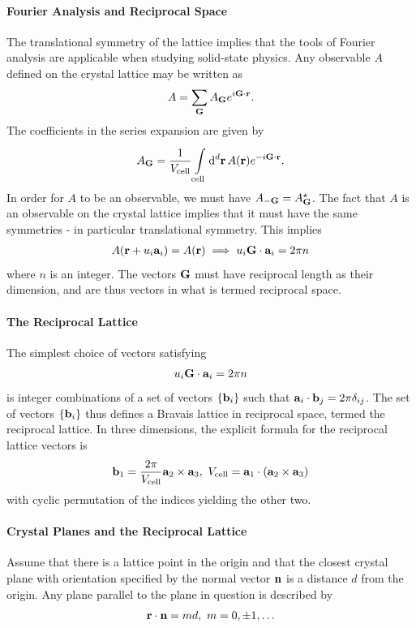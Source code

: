 \paragraph{Fourier Analysis and Reciprocal Space}
The translational symmetry of the lattice implies that the tools of Fourier analysis are applicable when studying solid-state physics. Any observable $A$ defined on the crystal lattice may be written as
\begin{align*}
	A = \sum\limits_{\vb{G}}A_{\vb{G}}e^{i\vb{G}\cdot\vb{r}}.
\end{align*}
The coefficients in the series expansion are given by
\begin{align*}
	A_{\vb{G}} = \frac{1}{V_{\text{cell}}}\integ[d]{\text{cell}}{}{\vb{r}}{A(\vb{r})e^{-i\vb{G}\cdot\vb{r}}}.
\end{align*}
In order for $A$ to be an observable, we must have $A_{-\vb{G}} = \cc{A_{\vb{G}}}$. The fact that $A$ is an observable on the crystal lattice implies that it must have the same symmetries - in particular translational symmetry. This implies
\begin{align*}
	A(\vb{r} + u_{i}\vb{a}_{i}) = A(\vb{r}) \implies u_{i}\vb{G}\cdot\vb{a}_{i} = 2\pi n
\end{align*}
where $n$ is an integer. The vectors $\vb{G}$ must have reciprocal length as their dimension, and are thus vectors in what is termed reciprocal space.

\paragraph{The Reciprocal Lattice}
The simplest choice of vectors satisfying
\begin{align*}
	u_{i}\vb{G}\cdot\vb{a}_{i} = 2\pi n
\end{align*}
is integer combinations of a set of vectors $\{\vb{b}_{i}\}$ such that $\vb{a}_{i}\cdot\vb{b}_{j} = 2\pi\delta_{ij}$. The set of vectors $\{\vb{b}_{i}\}$ thus defines a Bravais lattice in reciprocal space, termed the reciprocal lattice. In three dimensions, the explicit formula for the reciprocal lattice vectors is
\begin{align*}
	\vb{b}_{1} = \frac{2\pi}{V_{\text{cell}}}\vb{a}_{2}\times\vb{a}_{3},\ V_{\text{cell}} = \vb{a}_{1}\cdot(\vb{a}_{2}\times\vb{a}_{3})
\end{align*}
with cyclic permutation of the indices yielding the other two.

\paragraph{Crystal Planes and the Reciprocal Lattice}
Assume that there is a lattice point in the origin and that the closest crystal plane with orientation specified by the normal vector $\vb{n}$ is a distance $d$ from the origin. Any plane parallel to the plane in question is described by
\begin{align*}
	\vb{r}\cdot\vb{n} = md,\ m = 0, \pm 1, \dots
\end{align*}

